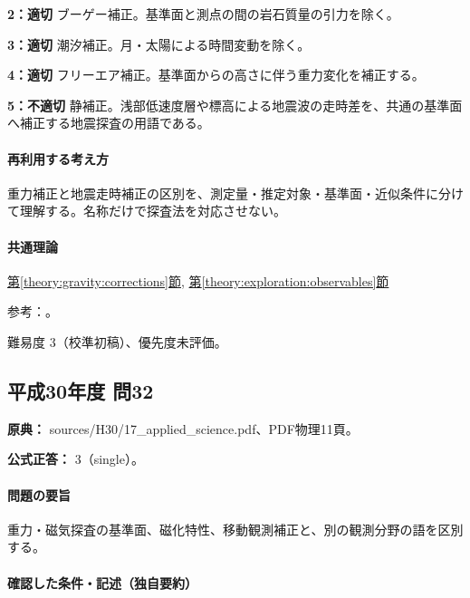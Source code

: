 \noindent\textbf{2：適切} ブーゲー補正。基準面と測点の間の岩石質量の引力を除く。\par

\noindent\textbf{3：適切} 潮汐補正。月・太陽による時間変動を除く。\par

\noindent\textbf{4：適切} フリーエア補正。基準面からの高さに伴う重力変化を補正する。\par

\noindent\textbf{5：不適切} 静補正。浅部低速度層や標高による地震波の走時差を、共通の基準面へ補正する地震探査の用語である。\par

\paragraph{再利用する考え方} 重力補正と地震走時補正の区別を、測定量・推定対象・基準面・近似条件に分けて理解する。名称だけで探査法を対応させない。

\paragraph{共通理論} \hyperref[theory:gravity:corrections]{第\ref*{theory:gravity:corrections}節}, \hyperref[theory:exploration:observables]{第\ref*{theory:exploration:observables}節}

\par 参考：\cite{gsi_gravity_definitions}。

\par 難易度 3（校準初稿）、優先度未評価。

\subsection{平成30年度 問32}
\label{q:h30-reg-applied-32}

\noindent\textbf{原典：} sources/H30/17\_applied\_science.pdf、PDF物理11頁。

\textbf{公式正答：} 3（single）。

\paragraph{問題の要旨} 重力・磁気探査の基準面、磁化特性、移動観測補正と、別の観測分野の語を区別する。

\paragraph{確認した条件・記述（独自要約）}\mbox{}\par

